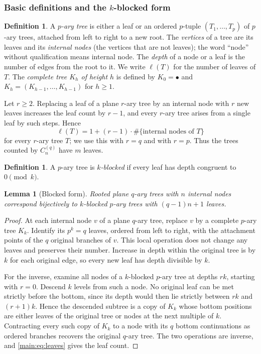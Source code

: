\documentclass[11pt]{article}
\newtheorem{lemma}[theorem]{Lemma}
\theoremstyle{definition}
\newtheorem{definition}[theorem]{Definition}
\theoremstyle{remark}
\numberwithin{equation}{section}
\numberwithin{figure}{section}
\newcommand{\fc}{C_n^{(q)}}
\begin{document}
\subsubsection{Basic definitions and the \texorpdfstring{$k$}{k}-blocked form}
\begin{definition}
A \emph{$p$-ary tree} is either a leaf or an ordered $p$-tuple $(T_1,\ldots,T_p)$ of $p$-ary trees, attached from left to right to a new root.  The \emph{vertices} of a tree are its leaves and its \emph{internal nodes} (the vertices that are not leaves); the word ``node'' without qualification means internal node.  The \emph{depth} of a node or a leaf is the number of edges from the root to it.  We write $\ell(T)$ for the number of leaves of $T$.  The \emph{complete tree $K_h$ of height $h$} is defined by $K_0=\bullet$ and $K_h=(K_{h-1},\ldots,K_{h-1})$ for $h\ge1$.
\end{definition}
Let $r\ge2$.  Replacing a leaf of a plane $r$-ary tree by an internal node with $r$ new leaves increases the leaf count by $r-1$, and every $r$-ary tree arises from a single leaf by such steps.  Hence
\begin{equation}\label{main:eq:leaves}
 \ell(T)=1+(r-1)\cdot\#\{\text{internal nodes of }T\}
\end{equation}
for every $r$-ary tree $T$; we use this with $r=q$ and with $r=p$.  Thus the trees counted by $\fc$ have $m$ leaves.
\begin{definition}
A $p$-ary tree is \emph{$k$-blocked} if every leaf has depth congruent to $0\pmod k$.
\end{definition}
\begin{lemma}[Blocked form]\label{main:lem:blocked}
Rooted plane $q$-ary trees with $n$ internal nodes correspond bijectively to $k$-blocked $p$-ary trees with $(q-1)n+1$ leaves.
\end{lemma}
\begin{proof}
At each internal node $v$ of a plane $q$-ary tree, replace $v$ by a complete $p$-ary tree $K_k$.  Identify its $p^k=q$ leaves, ordered from left to right, with the attachment points of the $q$ original branches of $v$.  This local operation does not change any leaves and preserves their number.  Increase in depth within the original tree is by $k$ for each original edge, so every new leaf has depth divisible by $k$.

For the inverse, examine all nodes of a $k$-blocked $p$-ary tree at depths $rk$, starting with $r=0$.  Descend $k$ levels from such a node.  No original leaf can be met strictly before the bottom, since its depth would then lie strictly between $rk$ and $(r+1)k$.  Hence the descended subtree is a copy of $K_k$ whose bottom positions are either leaves of the original tree or nodes at the next multiple of $k$.  Contracting every such copy of $K_k$ to a node with its $q$ bottom continuations as ordered branches recovers the original $q$-ary tree.  The two operations are inverse, and \eqref{main:eq:leaves} gives the leaf count.
\end{proof}
\end{document}
